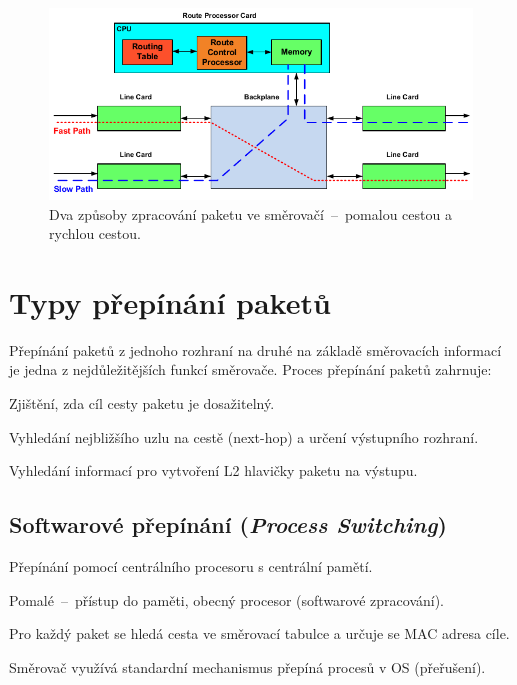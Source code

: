 \begin{figure}[H]
    \centering
    \includegraphics[width=1\linewidth]{rychla_a_pomala_cesta.pdf}
    \caption{Dva způsoby zpracování paketu ve směrovačí~--~pomalou cestou a rychlou cestou.}
\end{figure}


\section{Typy přepínání paketů}

Přepínání paketů z jednoho rozhraní na druhé na základě směrovacích informací je jedna z nejdůležitějších funkcí směrovače. Proces přepínání paketů zahrnuje: \begin{compactitem}
    \item Zjištění, zda cíl cesty paketu je dosažitelný.
    \item Vyhledání nejbližšího uzlu na cestě (next-hop) a určení výstupního rozhraní.
    \item Vyhledání informací pro vytvoření L2 hlavičky paketu na výstupu.
\end{compactitem}

\subsection{Softwarové přepínání (\textit{Process Switching})}

\begin{compactitem}
    \item Přepínání pomocí centrálního procesoru s centrální pamětí. \begin{compactitem}
        \item Pomalé~--~přístup do paměti, obecný procesor (softwarové zpracování).
    \end{compactitem}
    \item Pro každý paket se hledá cesta ve směrovací tabulce a určuje se MAC adresa cíle.
    \item Směrovač využívá standardní mechanismus přepíná procesů v OS (přeřušení).
\end{compactitem}

